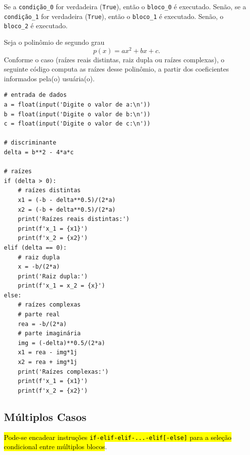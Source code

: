 Se a \lstinline+condição_0+ for verdadeira (\lstinline+True+), então o \lstinline+bloco_0+ é executado. Senão, se a \lstinline+condição_1+ for verdadeira (\lstinline+True+), então o \lstinline+bloco_1+ é executado. Senão, o \lstinline+bloco_2+ é executado.

\begin{ex}
  Seja o polinômio de segundo grau
  \begin{equation}
    p(x) = ax^2 + bx + c.
  \end{equation}
  Conforme o caso (raízes reais distintas, raiz dupla ou raízes complexas), o seguinte código computa as raízes desse polinômio, a partir dos coeficientes informados pela(o) usuária(o).

\begin{lstlisting}
# entrada de dados
a = float(input('Digite o valor de a:\n'))
b = float(input('Digite o valor de b:\n'))
c = float(input('Digite o valor de c:\n'))

# discriminante
delta = b**2 - 4*a*c

# raízes
if (delta > 0):
    # raízes distintas
    x1 = (-b - delta**0.5)/(2*a)
    x2 = (-b + delta**0.5)/(2*a)
    print('Raízes reais distintas:')
    print(f'x_1 = {x1}')
    print(f'x_2 = {x2}')
elif (delta == 0):
    # raiz dupla
    x = -b/(2*a)
    print('Raiz dupla:')
    print(f'x_1 = x_2 = {x}')
else:
    # raízes complexas
    # parte real
    rea = -b/(2*a)
    # parte imaginária
    img = (-delta)**0.5/(2*a)
    x1 = rea - img*1j
    x2 = rea + img*1j
    print('Raízes complexas:')
    print(f'x_1 = {x1}')
    print(f'x_2 = {x2}')
\end{lstlisting}

\end{ex}

\subsection{Múltiplos Casos}

\hl{Pode-se encadear instruções \texttt{if-elif-elif-...-elif[-else]} para a seleção condicional entre múltiplos blocos}.

